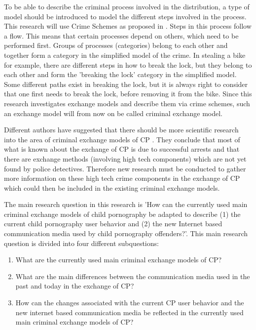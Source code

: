 \documentclass{sig-alternate-br}
\begin{document}
To be able to describe the criminal process involved in the distribution, a type of model should be introduced to model the different steps involved in the process. This research will use Crime Schemes as proposed in \cite{willison2006understanding}. Steps in this process follow a flow. This means that certain processes depend on others, which need to be performed first. Groups of processes (categories) belong to each other and together form a category in the simplified model of the crime. In stealing a bike for example, there are different steps in how to break the lock, but they belong to each other and form the 'breaking the lock' category in the simplified model. Some different paths exist in breaking the lock, but it is always right to consider that one first needs to break the lock, before removing it from the bike. Since this research investigates exchange models and describe them via crime schemes, such an exchange model will from now on be called criminal exchange model.

Different authors have suggested that there should be more scientific research into the area of criminal exchange models of CP \cite{wijk2009achter, wolak2005child, zee2007kinderpornografische}. They conclude that most of what is known about the exchange of CP is due to successful arrests and that there are exchange methods (involving high tech components) which are not yet found by police detectives. Therefore new research must be conducted to gather more information on these high tech crime components in the exchange of CP which could then be included in the existing criminal exchange models.

The main research question in this research is 'How can the currently used main criminal exchange models of child pornography be adapted to describe (1) the current child pornography user behavior and (2) the new Internet based communication media used by child pornography offenders?'. This main research question is divided into four different subquestions:
\begin{enumerate}
	\item What are the currently used main criminal exchange models of CP?
	\item What are the main differences between the communication media used in the past and today in the exchange of CP?
	\item How can the changes associated with the current CP user behavior and the new internet based communication media be reflected in the currently used main criminal exchange models of CP? 
\end{enumerate}
\end{document}
